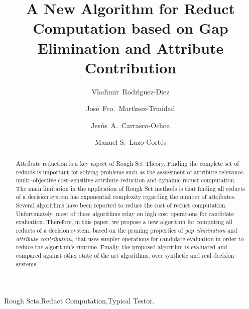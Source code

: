 \documentclass[number,preprint,review,12pt]{elsarticle}
\begin{document}
	\title{A New Algorithm for Reduct Computation based on Gap Elimination and Attribute Contribution}
	
	\author[inaoe,uc]{Vlad\'{\i}mir~Rodr\'{\i}guez-Diez}
	\author[inaoe]{Jos\'{e}~Fco.~Mart\'{\i}nez-Trinidad}
	\author[inaoe]{Jes\'{u}s~A.~Carrasco-Ochoa}	
	\author[inaoe]{Manuel S.~Lazo-Cort\'{e}s}
	\address[inaoe]{Computer Science Department\\
					Instituto Nacional de Astrof\'{\i}sica, \'{O}ptica y Electr\'{o}nica\\
					Luis Enrique Erro \# 1, Santa Mar\'{\i}a Tonantzintla, Puebla, 72840, M\'{e}xico} 
	\address[uc]{Electrical Engineering Department\\
				 Universidad de Camag\"{u}ey\\
				 Circv. Nte. km 5$\frac{1}{2}$, Camag\"{u}ey, Cuba}
	
	\begin{abstract}
		Attribute reduction is a key aspect of Rough Set Theory.  Finding the complete set of reducts is important for solving problems such as the assessment of attribute relevance, multi--objective cost--sensitive attribute reduction and dynamic reduct computation. The main limitation in the application of Rough Set methods is that finding all reducts of a decision system has exponential complexity regarding the number of attributes. Several algorithms have been reported to reduce the cost of reduct computation. Unfortunately, most of these algorithms relay on high cost operations for candidate evaluation. Therefore, in this paper, we propose a new algorithm for computing all reducts of a decision system, based on the pruning properties of \textit{gap  elimination} and \textit{attribute contribution}, that uses simpler operations for candidate evaluation in order to reduce the algorithm's runtime. Finally, the proposed algorithm is evaluated and compared against other state of the art algorithms, over synthetic and real decision systems.
	\end{abstract}
	
	\begin{keyword}
		Rough Sets\sep Reduct Computation\sep Typical Testor.
	\end{keyword}

	\maketitle

\end{document}
